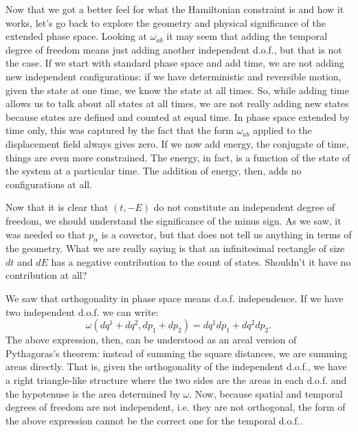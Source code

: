 Now that we got a better feel for what the Hamiltonian constraint is and how it works, let's go back to explore the geometry and physical significance of the extended phase space. Looking at $\omega_{ab}$ it may seem that adding the temporal degree of freedom means just adding another independent d.o.f., but that is not the case. If we start with standard phase space and add time, we are not adding new independent configurations: if we have deterministic and reversible motion, given the state at one time, we know the state at all times. So, while adding time allows us to talk about all states at all times, we are not really adding new states because states are defined and counted at equal time. In phase space extended by time only, this was captured by the fact that the form $\omega_{ab}$ applied to the displacement field always gives zero. If we now add energy, the conjugate of time, things are even more constrained. The energy, in fact, is a function of the state of the system at a particular time. The addition of energy, then, adds no configurations at all.

Now that it is clear that $(t, -E)$ do not constitute an independent degree of freedom, we should understand the significance of the minus sign. As we saw, it was needed so that $p_\alpha$ is a covector, but that does not tell us anything in terms of the geometry. What we are really saying is that an infinitesimal rectangle of size $dt$ and $dE$ has a negative contribution to the count of states. Shouldn't it have no contribution at all?

We saw that orthogonality in phase space means d.o.f. independence. If we have two independent d.o.f. we can write:
\begin{equation}\label{rp-cm-rel-spatialPythagoras}
	\omega(dq^1 + dq^2, dp_1 + dp_2) = dq^1 dp_1 + dq^2 dp_2.
\end{equation}
The above expression, then, can be understood as an areal version of Pythagoras's theorem: instead of summing the square distances, we are summing areas directly. That is, given the orthogonality of the independent d.o.f., we have a right triangle-like structure where the two sides are the areas in each d.o.f. and the hypotenuse is the area determined by $\omega$.  Now, because spatial and temporal degrees of freedom are not independent, i.e. they are not orthogonal, the form of the above expression cannot be the correct one for the temporal d.o.f..

